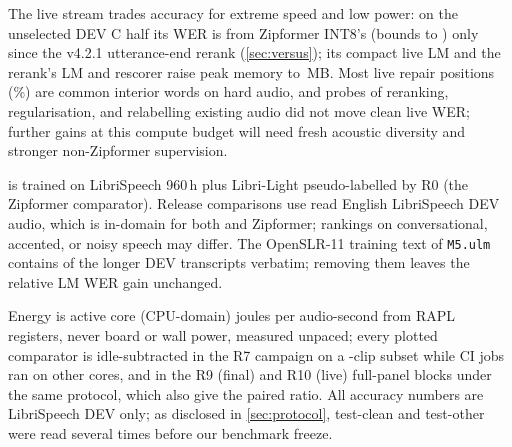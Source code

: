  The live stream trades accuracy for extreme speed and
low power: on the unselected DEV C half its WER is \LivCZipDelta\pp from Zipformer INT8's (bounds \LivCZipLo{} to
\LivCZipHi) only since the v4.2.1 utterance-end rerank (\cref{sec:versus}); its compact live LM and the rerank's LM and
rescorer raise peak memory to \ColdLiveRss\,MB. Most live repair positions (\VfDiagInteriorPct\%) are common interior words on hard
audio, and probes of reranking, regularisation, and relabelling existing audio did not move clean live
WER; further gains at this compute budget will need fresh acoustic diversity and stronger
non-Zipformer supervision.

 \ultra{} is trained on LibriSpeech 960\,h plus Libri-Light
pseudo-labelled by R0 (the Zipformer comparator). Release comparisons use read English LibriSpeech DEV
audio, which is in-domain for both \ultra{} and Zipformer; rankings on conversational, accented, or
noisy speech may differ. The OpenSLR-11 training text of \texttt{M5.ulm} contains \LmOverlapCount{} of
the \LmOverlapOf{} longer DEV transcripts verbatim; removing them leaves the relative LM WER gain
unchanged.

 \ColdHostSentence{} \ColdSubsetSentence{}
Energy is active core (CPU-domain) joules per audio-second from RAPL registers, never board or wall
power, measured unpaced; every plotted comparator is idle-subtracted in the R7 campaign on a
\RsevenClips-clip subset while CI jobs ran on other cores, and \ultra{} in the R9 (final) and R10 (live) full-panel blocks under the same protocol,
which also give the paired ratio. All accuracy numbers are LibriSpeech DEV only;
as disclosed in \cref{sec:protocol}, test-clean and test-other were read several times before our
benchmark freeze.
